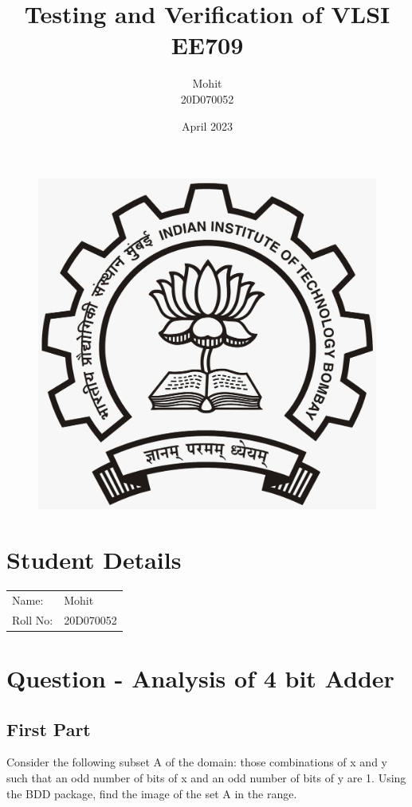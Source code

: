 \documentclass[12pt]{article}
\title{Testing and Verification of VLSI\\EE709}
\author{Mohit\\20D070052 }
\date{April 2023}
\begin{document}
\maketitle
\begin{figure}[H]
\begin{center}
\includegraphics[scale = 0.2]{LOGO.jpeg}
\end{center}
\end{figure}
\section{Student Details}
\begin{tabular}{ l l  }
 Name: & Mohit \\ 
 Roll No: & 20D070052  \\  
\end{tabular}

\section{Question - Analysis of 4 bit Adder}

\subsection{First Part}

Consider the following subset A of the domain: those combinations of x and y such that an odd number of bits of x and an odd number of bits of y are 1. Using the BDD package, find the image of the set A in the range.\\
\end{document}
